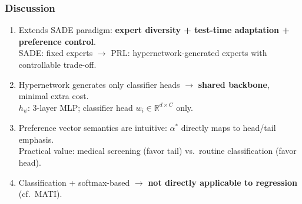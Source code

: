 \documentclass[10pt,aspectratio=169]{beamer}
\begin{document}
\begin{frame}
\frametitle{Discussion}
{\small
\begin{enumerate}\setlength\itemsep{10pt}
  \item Extends SADE paradigm: \textbf{expert diversity + test-time adaptation + preference control}.\\
        {\scriptsize SADE: fixed experts $\rightarrow$ PRL: hypernetwork-generated experts with controllable trade-off.}

  \item Hypernetwork generates only classifier heads $\rightarrow$ \textbf{shared backbone}, minimal extra cost.\\
        {\scriptsize $h_\psi$: 3-layer MLP; classifier head $w_i \in \mathbb{R}^{d\times C}$ only.}

  \item Preference vector semantics are intuitive: $\alpha^*$ directly maps to head/tail emphasis.\\
        {\scriptsize Practical value: medical screening (favor tail) vs.\ routine classification (favor head).}

  \item Classification + softmax-based $\rightarrow$ \textbf{not directly applicable to regression} (cf.\ MATI).
\end{enumerate}
}
\end{frame}
\end{document}
